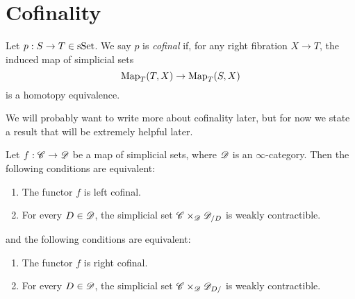 \documentclass[../thesis.tex]{subfiles}
\begin{document}
\section{Cofinality}
\begin{definition}{\cite[Definition 4.1.1.1]{HTT}}
    Let \(p:S\to T \in \mathrm{sSet} \). We say $p$ is \emph{cofinal} if, for any right fibration $X\to T$, the induced map of simplicial sets
    \[
        \mathrm{Map}_T(T,X) \to \mathrm{Map}_T(S,X)
    \]
    is a homotopy equivalence.
\end{definition}
We will probably want to write more about cofinality later, but for now we state a result that will be extremely helpful later.
\begin{theorem}{\cite[\href{https://kerodon.net/tag/02NY}{Theorem 02NY}]{kerodon}\label{superlemma}}
    Let \(f: \mathscr{C} \to \mathscr{D}\) be a map of simplicial sets, where $\mathscr{D}$ is an $\infty$-category.
    Then the following conditions are equivalent:
    \begin{enumerate}
        \item The functor $f$ is left cofinal.
        \item For every $D\in \mathscr{D}$, the simplicial set $\mathscr{C}\times_{\mathscr{D}} \mathscr{D}_{/D}$ is weakly contractible.
    \end{enumerate}
    and the following conditions are equivalent:
    \begin{enumerate}
        \item The functor $f$ is right cofinal.
        \item For every $D\in \mathscr{D}$, the simplicial set $\mathscr{C}\times_{\mathscr{D}} \mathscr{D}_{D/}$ is weakly contractible.
    \end{enumerate}
\end{theorem}
\end{document}
